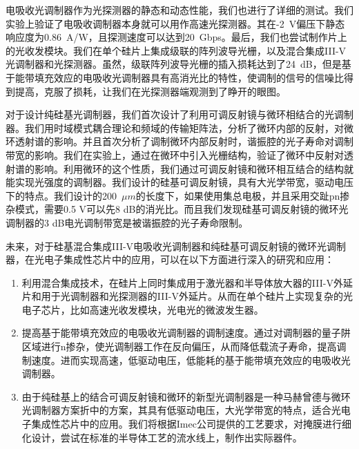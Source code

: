 电吸收光调制器作为光探测器的静态和动态性能，我们也进行了详细的测试。我们实验上验证了电吸收调制器本身就可以用作高速光探测器。其在-2~V偏压下静态响应度为0.86~A/W，且探测速度可以达到20~Gbps。最后，我们也尝试制作片上的光收发模块。我们在单个硅片上集成级联的阵列波导光栅，以及混合集成III-V光调制器和光探测器。虽然，级联阵列波导光栅的插入损耗达到了24~dB，但是基于能带填充效应的电吸收光调制器具有高消光比的特性，使调制的信号的信噪比得到提高，克服了损耗，让我们在光探测器端观测到了睁开的眼图。

对于设计纯硅基光调制器，我们首次设计了利用可调反射镜与微环相结合的光调制器。我们用时域模式耦合理论和频域的传输矩阵法，分析了微环内部的反射，对微环透射谱的影响。并且首次分析了调制微环内部反射时，谐振腔的光子寿命对调制带宽的影响。我们在实验上，通过在微环中引入光栅结构，验证了微环中反射对透射谱的影响。利用微环的这个性质，我们通过可调反射镜和微环相互结合的结构就能实现光强度的调制器。我们设计的硅基可调反射镜，具有大光学带宽，驱动电压下的特点。我们设计的200~$\mu m$的长度下，如果使用集总电极，并且采用交趾pn掺杂模式，需要0.5 V可以先8 dB的消光比。而且我们发现硅基可调反射镜的微环光调制器的3 dB电光调制带宽是被谐振腔的光子寿命限制。

未来，对于硅基混合集成III-V电吸收光调制器和纯硅基可调反射镜的微环光调制器，在光电子集成性芯片中的应用，可以在以下方面进行深入的研究和应用：
\begin{enumerate}[(1)]
	\item 利用混合集成技术，在硅片上同时集成用于激光器和半导体放大器的III-V外延片和用于光调制器和光探测器的III-V外延片。从而在单个硅片上实现复杂的光电子芯片，比如高速光收发模块，光电光的微波发生器。
	\item 提高基于能带填充效应的电吸收光调制器的调制速度。通过对调制器的量子阱区域进行n掺杂，使光调制器工作在反向偏压，从而降低载流子寿命，提高调制速度。进而实现高速，低驱动电压，低能耗的基于能带填充效应的电吸收光调制器。
	\item 由于纯硅基上的结合可调反射镜和微环的新型光调制器是一种马赫曾德与微环光调制器方案折中的方案，其具有低驱动电压，大光学带宽的特点，适合光电子集成性芯片中的应用。我们将根据Imec公司提供的工艺要求，对掩膜进行细化设计，尝试在标准的半导体工艺的流水线上，制作出实际器件。
\end{enumerate}
